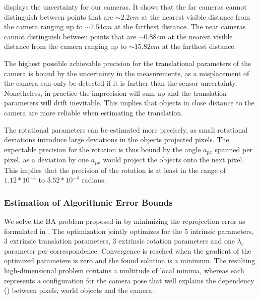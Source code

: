  displays the uncertainty for our cameras.
It shows that the far cameras cannot distinguish between points that are $\sim 2.2 cm$ at the nearest visible distance from the camera ranging up to $\sim 7.54 cm$ at the farthest distance.
The near cameras cannot distinguish between points that are $\sim 0.88 cm$ at the nearest visible distance from the camera ranging up to $\sim 15.82 cm$ at the farthest distance.

The highest possible achievable precision for the translational parameters of the camera is bound by the uncertainty in the measurements, as a misplacement of the camera can only be detected if it is farther than the sensor uncertainty.
Nonetheless, in practice the imprecision will sum up and the translation parameters will drift inevitable. 
This implies that objects in close distance to the camera are more reliable when estimating the translation.

The rotational parameters can be estimated more precisely, as small rotational deviations introduce large deviations in the objects projected pixels.
The expectable precision for the rotation is thus bound by the angle $a_{px}$ spanned per pixel, as a deviation by one $a_{px}$ would project the objects onto the next pixel.
This implies that the precision of the rotation is at least in the range of $1.12 * 10^{-4}$ to $3.52 * 10^{-4}$ radians. 


\subsubsection{Estimation of Algorithmic Error Bounds}
We solve the BA problem proposed in  by minimizing the reprojection-error as formulated in .
The optimization jointly optimizes for the 5 intrinsic parameters, 3 extrinsic translation parameters, 3 extrinsic rotation parameters and one $\lambda_c$ parameter per correspondence.
Convergence is reached when the gradient of the optimized parameters is zero and the found solution is a minimum.
The resulting high-dimensional problem contains a multitude of local minima, whereas each represents a configuration for the camera pose that well explains the dependency () between pixels, world objects and the camera. 

